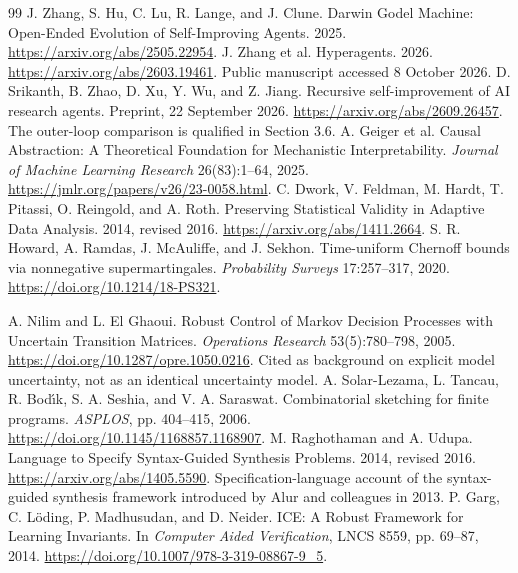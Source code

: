 \documentclass[11pt,letterpaper]{article}
\theoremstyle{plain}
\theoremstyle{definition}
\begin{document}
\begin{thebibliography}{99}
 J. Zhang, S. Hu, C. Lu, R. Lange, and J. Clune. Darwin Godel Machine: Open-Ended Evolution of Self-Improving Agents. 2025. \url{https://arxiv.org/abs/2505.22954}.
 J. Zhang et al. Hyperagents. 2026. \url{https://arxiv.org/abs/2603.19461}. Public manuscript accessed 8 October 2026.
 D. Srikanth, B. Zhao, D. Xu, Y. Wu, and Z. Jiang. Recursive self-improvement of AI research agents. Preprint, 22 September 2026. \url{https://arxiv.org/abs/2609.26457}. The outer-loop comparison is qualified in Section 3.6.
 A. Geiger et al. Causal Abstraction: A Theoretical Foundation for Mechanistic Interpretability. \emph{Journal of Machine Learning Research} 26(83):1--64, 2025. \url{https://jmlr.org/papers/v26/23-0058.html}.
 C. Dwork, V. Feldman, M. Hardt, T. Pitassi, O. Reingold, and A. Roth. Preserving Statistical Validity in Adaptive Data Analysis. 2014, revised 2016. \url{https://arxiv.org/abs/1411.2664}.
 S. R. Howard, A. Ramdas, J. McAuliffe, and J. Sekhon. Time-uniform Chernoff bounds via nonnegative supermartingales. \emph{Probability Surveys} 17:257--317, 2020. \url{https://doi.org/10.1214/18-PS321}.

 A. Nilim and L. El Ghaoui. Robust Control of Markov Decision Processes with Uncertain Transition Matrices. \emph{Operations Research} 53(5):780--798, 2005. \url{https://doi.org/10.1287/opre.1050.0216}. Cited as background on explicit model uncertainty, not as an identical uncertainty model.
 A. Solar-Lezama, L. Tancau, R. Bod\'{\i}k, S. A. Seshia, and V. A. Saraswat. Combinatorial sketching for finite programs. \emph{ASPLOS}, pp. 404--415, 2006. \url{https://doi.org/10.1145/1168857.1168907}.
 M. Raghothaman and A. Udupa. Language to Specify Syntax-Guided Synthesis Problems. 2014, revised 2016. \url{https://arxiv.org/abs/1405.5590}. Specification-language account of the syntax-guided synthesis framework introduced by Alur and colleagues in 2013.
 P. Garg, C. L\"oding, P. Madhusudan, and D. Neider. ICE: A Robust Framework for Learning Invariants. In \emph{Computer Aided Verification}, LNCS 8559, pp. 69--87, 2014. \url{https://doi.org/10.1007/978-3-319-08867-9_5}.
\end{thebibliography}
\end{document}
